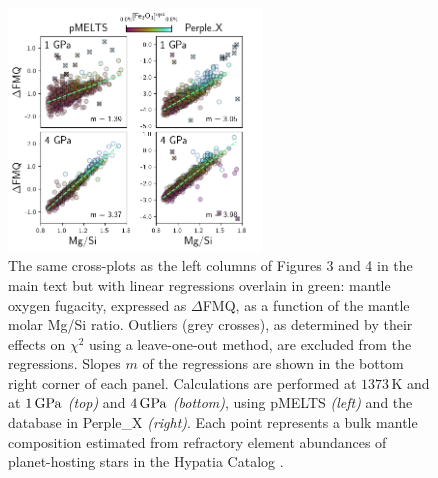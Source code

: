 \documentclass[times]{oupau}
\begin{document}
\begin{figure}[!h]
         \centering
         \includegraphics[width=0.6\textwidth]{figs/crossplot_mgsi_fit.png}
        \caption{The same cross-plots as the left columns of Figures 3 and 4 in the main text but with linear regressions overlain in green: mantle oxygen fugacity, expressed as $\Delta$FMQ, as a function of the mantle molar Mg/Si ratio. Outliers (grey crosses), as determined by their effects on $\chi^2$ using a leave-one-out method, are excluded from the regressions.        Slopes $m$ of the regressions are shown in the bottom right corner of each panel. Calculations are performed at $1373\,\text{K}$ and at $1\,{\rm GPa}$ \textit{(top)} and $4\,{\rm GPa}$ \textit{(bottom)}, using pMELTS \textit{(left)} and the \citet{jennings_simple_2015} database in Perple\_X \textit{(right)}. Each point represents a bulk mantle composition estimated from refractory element abundances of planet-hosting stars in the Hypatia Catalog \citep{hinkel_stellar_2014}.}
        \label{fig:mgsi_fit}
\end{figure}
\end{document}
